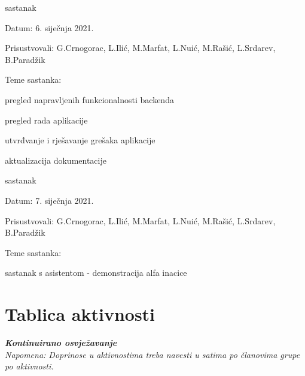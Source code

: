 \begin{packed_enum}
			\item  sastanak
			\item[] \begin{packed_item}
				\item Datum: 6. siječnja 2021.
				\item Prisustvovali: G.Crnogorac, L.Ilić, M.Marfat, L.Nuić, M.Rašić, L.Srdarev, B.Paradžik
				\item Teme sastanka:
				\begin{packed_item}
					\item  pregled napravljenih funkcionalnosti backenda 
					\item  pregled rada aplikacije
					\item  utvrđvanje i rješavanje
					 grešaka aplikacije
					\item  aktualizacija dokumentacije
				\end{packed_item}
			\end{packed_item}
		
			\item  sastanak
			\item[] \begin{packed_item}
				\item Datum: 7. siječnja 2021.
				\item Prisustvovali: G.Crnogorac, L.Ilić, M.Marfat, L.Nuić, M.Rašić, L.Srdarev, B.Paradžik
				\item Teme sastanka:
				\begin{packed_item}
					\item  sastanak s asistentom - demonstracija alfa inacice
				\end{packed_item}
			\end{packed_item}
		
			
			
			
			
			
		\end{packed_enum}
		
		\eject
		\section*{Tablica aktivnosti}
		
			\textbf{\textit{Kontinuirano osvježavanje}}\\
			
			 \textit{Napomena: Doprinose u aktivnostima treba navesti u satima po članovima grupe po aktivnosti.}
					
						
			
